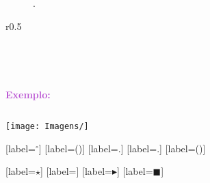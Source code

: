 \begin{figure}[h]
    \centering
    \caption{.}
    \label{fig:}
\end{figure}

\begin{wrapfigure}{r}{0.5\textwidth}
    \centering
    \caption{}
    \label{fig:}
\end{wrapfigure}

\begin{figure}[h]
    \centering
     \\ %
    \caption{}
    \label{fig:}
\end{figure}
  
 \\ %


\textcolor{MediumOrchid}{\textbf{}}

\ce{^{}}

\textcolor{DarkTurquoise}{\Large\LobsterTwo\textbf{}}
\textcolor{DarkTurquoise}{\textbf{}}

\textcolor{MediumOrchid}{\textbf{Exemplo:}}


\textcolor{CarnationPink}{$$}

\begin{center}
\texttt{[image: Imagens/]}
\end{center}

[label=\textcolor{CarnationPink}{\arabic*${}^\circ$}]
[label=\textcolor{CarnationPink}{(\alph*)}]
[label=\textcolor{CarnationPink}{\roman*.}]
[label=\textcolor{CarnationPink}{\arabic*.}]
[label=\textcolor{CarnationPink}{(\roman*)}]


[label=\textcolor{CarnationPink}{$\star$}]
[label=\textcolor{CarnationPink}{\textopenbullet}]
[label=\textcolor{CarnationPink}{$\blacktriangleright$}]
[label=\textcolor{CarnationPink}{$\blacksquare$}]


\textcolor{CarnationPink}{$\mathbf{}$}
\textcolor{DarkTurquoise}{$\mathbf{}$}
\textcolor{MediumOrchid}{$\mathbf{}$}

\textcolor{DarkTurquoise}{\textbf{}}
\textcolor{MediumOrchid}{\textbf{}}


